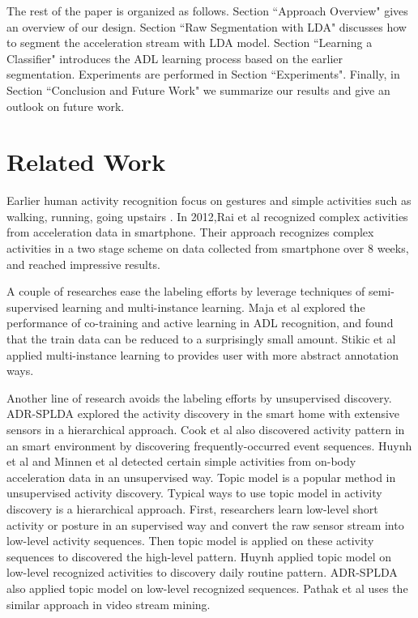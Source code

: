 \documentclass{sigchi}
\begin{document}
The rest of the paper is organized as follows.
Section ``Approach Overview" gives an overview of our design.
Section ``Raw Segmentation with LDA" discusses how to segment the acceleration stream with LDA model. Section ``Learning a Classifier" introduces the ADL learning process based on the earlier segmentation. Experiments are performed in Section ``Experiments".
Finally, in Section ``Conclusion and Future Work" we summarize our results and give an outlook on future work.


\section{Related Work}
\label{sec.related-work}

Earlier human activity recognition focus on gestures and simple activities such as walking, running, going upstairs \cite{kwapisz2011activity, liang1998real, mantyjarvi2001recognizing}.
In 2012,Rai et al \cite{rai2012mining} recognized complex activities from acceleration data in smartphone. Their approach recognizes complex activities in a two stage scheme on data collected from smartphone over 8 weeks, and reached impressive results.

A couple of researches ease the labeling efforts by leverage techniques of semi-supervised learning and multi-instance learning.
Maja et al \cite{stikic2008exploring} explored the performance of co-training and active learning in ADL recognition, and found that the train data can be reduced to a surprisingly small amount.
Stikic et al \cite{stikic2009activity} applied multi-instance learning to provides user with more abstract annotation ways.

Another line of research avoids the labeling efforts by unsupervised discovery.
ADR-SPLDA \cite{chikhaoui2012adr} explored the activity discovery in the smart home with extensive sensors in a hierarchical approach. Cook et al\cite{cook2013activity} also discovered activity pattern in an smart environment by discovering frequently-occurred event sequences.
Huynh et al \cite{huynh2006unsupervised} and Minnen et al \cite{minnen2006discovering} detected certain simple activities from on-body acceleration data in an unsupervised way. Topic model is a popular method in unsupervised activity discovery.
Typical ways to use topic model in activity discovery is a hierarchical approach.
First, researchers learn low-level short activity or posture in an supervised way and convert the raw sensor stream into low-level activity sequences.
Then topic model is applied on these activity sequences to discovered the high-level pattern.
Huynh \cite{huynh2008discovery} applied topic model on low-level recognized activities to discovery daily routine pattern.
ADR-SPLDA \cite{chikhaoui2012adr} also applied topic model on low-level recognized sequences.
Pathak et al \cite{wang2009human} uses the similar approach in video stream mining.
\end{document}
